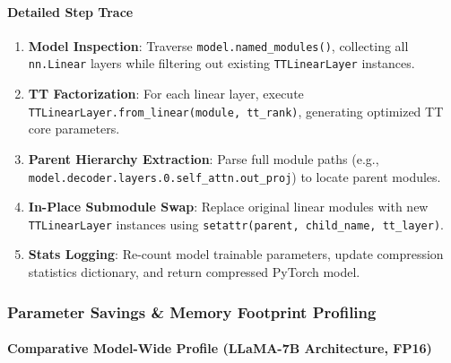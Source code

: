 \paragraph{Detailed Step Trace}
\begin{enumerate}
\item \textbf{Model Inspection}: Traverse \texttt{model.named\_modules()}, collecting all \texttt{nn.Linear} layers while filtering out existing \texttt{TTLinearLayer} instances.
\item \textbf{TT Factorization}: For each linear layer, execute \texttt{TTLinearLayer.from\_linear(module, tt\_rank)}, generating optimized TT core parameters.
\item \textbf{Parent Hierarchy Extraction}: Parse full module paths (e.g., \texttt{model.decoder.layers.0.self\_attn.out\_proj}) to locate parent modules.
\item \textbf{In-Place Submodule Swap}: Replace original linear modules with new \texttt{TTLinearLayer} instances using \texttt{setattr(parent, child\_name, tt\_layer)}.
\item \textbf{Stats Logging}: Re-count model trainable parameters, update compression statistics dictionary, and return compressed PyTorch model.


\end{enumerate}
\subsubsection*{Parameter Savings \& Memory Footprint Profiling}

\paragraph{Comparative Model-Wide Profile (LLaMA-7B Architecture, FP16)}

